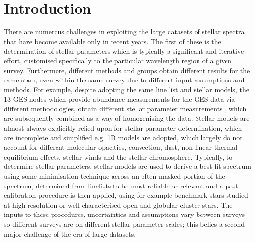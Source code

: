 \documentclass[12pt, preprint]{aastex}
\newcommand{\teff}{\mbox{$\rm T_{eff}$}}
\newcommand{\feh}{\mbox{$\rm [Fe/H]$}}
\newcommand{\logg}{\mbox{$\rm \log g$}}
\newcommand{\apogee}{\textsl{APOGEE}}
\begin{document}
\begin{abstract}
Results:   Using only 550 training stars with \textit{known} labels to construct our model, we reproduce the stellar parameters for the stars in the \apogee\ survey from DR10, to \teff\ --12 $\pm$ 87 K, \logg\ --0.04 $\pm$ 0.18 and \feh\ +0.01 $\pm$ 0.08. The rms error between our results and that of \apogee\ is comparable to the error estimates in each of their parameters. As our approach has extremely small intrinsic errors,  we can determine the stellar parameters at a fraction (25\%) of the signal to noise required by minimisation techniques. Our method is expandable to additional labels and relevant for chemical tagging and motivates the importance of having a ``gold standard'' set of stars studied at high resolution. 



\end{abstract}

\section{Introduction}

There are numerous challenges in exploiting the large datasets of stellar spectra that have become available only in recent years. The first of these is the determination of stellar parameters which is typically a significant and iterative effort, customised specifically to the particular wavelength region of a given survey. Furthermore, different methods and groups obtain different results for the same stars, even within the same survey due to different input assumptions and methods. For example, despite adopting the same line list and stellar models, the 13 GES nodes which provide abundance measurements for the GES data via different methodologies, obtain different stellar parameter measurements  \citep{Smiljanic2014}, which are subsequently combined as a way of homogenising the data.  Stellar models are almost always explicitly relied upon for stellar parameter determination, which are incomplete and simplified e.g. 1D models are adopted, which  largely do not account for different molecular opacities, convection, dust, non linear thermal equilibrium effects, stellar winds and the stellar chromosphere. Typically, to determine stellar parameters, stellar models are used to derive a best-fit spectrum using some minimisation technique across an often masked portion of the spectrum, determined from linelists to be most reliable or relevant and a post-calibration procedure is then applied, using for example benchmark stars studied at high resolution or well characterised open and globular cluster stars. The inputs to these procedures, uncertainties and assumptions vary between surveys so different surveys are on different stellar parameter scales; this belies a second major challenge of the era of large datasets. 
\end{document}
